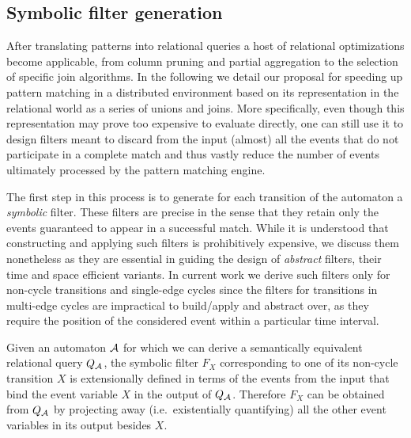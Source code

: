 \subsection{Symbolic filter generation}
\label{sec:prec_filter_generation}



After translating patterns into relational queries a host of relational 
optimizations become applicable, from column pruning and partial aggregation to
the selection of specific join algorithms.
In the following we detail our proposal for speeding up pattern matching in a 
distributed environment based on its representation in the relational world as 
a series of unions and joins.
More specifically, even though this representation may prove too expensive to 
evaluate directly, one can still use it to design filters meant to discard from 
the input (almost) all the events that do not participate in a complete match 
and thus vastly reduce the number of events ultimately processed by the pattern 
matching engine.
 


The first step in this process is to generate for each transition of the 
automaton a {\em symbolic} filter.
These filters are precise in the sense that they retain only the events  
guaranteed to appear in a successful match.
While it is understood that constructing and applying such filters is 
prohibitively expensive, we discuss them nonetheless as they are essential in 
guiding the design of {\em abstract} filters, their time and space efficient 
variants. 
In current work we derive such filters only for non-cycle transitions and 
single-edge cycles since the filters for transitions in multi-edge cycles 
are impractical to build/apply and abstract over, as they require the position 
of the considered event within a particular time interval.



Given an automaton $\mathcal{A}$ for which we can derive a semantically equivalent  
relational query $Q_{\mathcal{A}}$, the symbolic filter $F_X$ corresponding to one of 
its non-cycle transition $X$ is extensionally defined in terms of the events 
from the input that bind the event variable $X$ in the output of $Q_{\mathcal{A}}$. 
Therefore $F_X$ can be obtained from $Q_{\mathcal{A}}$ by projecting away (i.e.\ 
existentially quantifying) all the other event variables in its output besides 
$X$.

